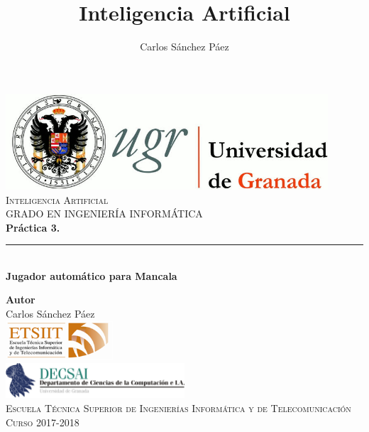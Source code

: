 \documentclass[12pt,spanish]{article}
\title{Inteligencia Artificial}
\author{Carlos Sánchez Páez}
\begin{document}
\begin{titlepage}

\newlength{\centeroffset}
\setlength{\centeroffset}{-0.5\oddsidemargin}
\addtolength{\centeroffset}{0.5\evensidemargin}
\thispagestyle{empty}

\noindent\hspace*{\centeroffset}
\begin{minipage}{\textwidth}

\centering
\includegraphics[width=0.9\textwidth]{logo_ugr.jpg}\\[1.4cm]

\textsc{ \Large Inteligencia Artificial\\[0.2cm]}
\textsc{GRADO EN INGENIERÍA INFORMÁTICA}\\[1cm]

{\Huge\bfseries Práctica 3.\\
}
\noindent\rule[-1ex]{\textwidth}{3pt}\\[3.5ex]
{\large\bfseries Jugador automático para Mancala}
\end{minipage}

\vspace{1.5cm}
\noindent\hspace*{\centeroffset}
\begin{minipage}{\textwidth}
\centering

\textbf{Autor}\\ {Carlos Sánchez Páez}\\[2.5ex]
\includegraphics[width=0.3\textwidth]{etsiit_logo.png}\\[0.1cm]
\vspace{1.5cm}
\includegraphics[width=0.5\textwidth]{decsai.jpg}\\[0.1cm]
\vspace{1cm}
\textsc{Escuela Técnica Superior de Ingenierías Informática y de Telecomunicación}\\
\vspace{1cm}
\textsc{Curso 2017-2018}
\end{minipage}
\end{titlepage}
\thispagestyle{empty}
\newpage
\tableofcontents{}
\newpage
\thispagestyle{empty}
\end{document}
